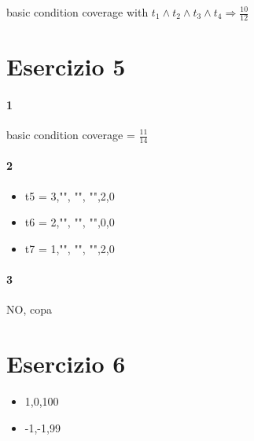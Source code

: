 basic condition coverage with $t_1 \land t_2 \land t_3 \land t_4 \Rightarrow \frac {10} {12}$

\section{Esercizio 5}

\paragraph{1}

basic condition coverage = $\frac {11} {14}$

\paragraph{2}

\begin{itemize}
  \item t5 = 3,{"", "", ""},2,0
  \item t6 = 2,{"", "", ""},0,0
  \item t7 = 1,{"", "", ""},2,0
\end{itemize}

\paragraph{3}

NO, copa

\section{Esercizio 6}

\begin{itemize}
  \item 1,0,100
  \item -1,-1,99
\end{itemize}
